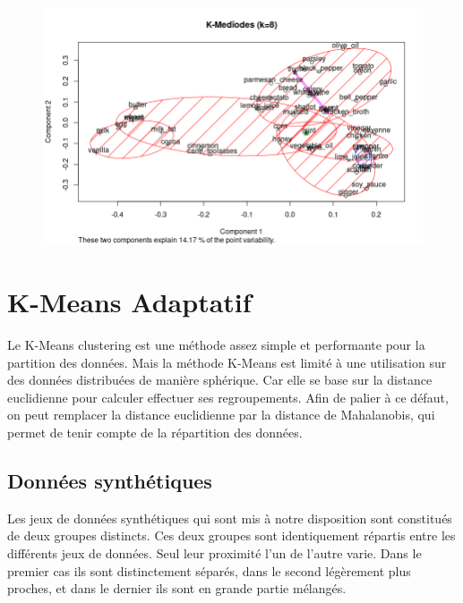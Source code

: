 \documentclass[a4paper, titlepage]{report}
\begin{document}
\begin{figure}[h]
\begin{center}
		\includegraphics[scale = 0.45]{./doc/kmediodes-8.png}
	\end{center}
\end{figure}


\chapter{K-Means Adaptatif}

Le K-Means clustering est une méthode assez simple et performante pour la partition des données. Mais la méthode K-Means est limité à une utilisation sur des données distribuées de manière sphérique. Car elle se base sur la distance euclidienne pour calculer effectuer ses regroupements. Afin de palier à ce défaut, on peut remplacer la distance euclidienne par la distance de Mahalanobis, qui permet de tenir compte de la répartition des données.

\section{Données synthétiques}

Les jeux de données synthétiques qui sont mis à notre disposition sont constitués de deux groupes distincts. Ces deux groupes sont identiquement répartis entre les différents jeux de données. Seul leur proximité l'un de l'autre varie. Dans le premier cas ils sont distinctement séparés, dans le second légèrement plus proches, et dans le dernier ils sont en grande partie mélangés.
\end{document}
